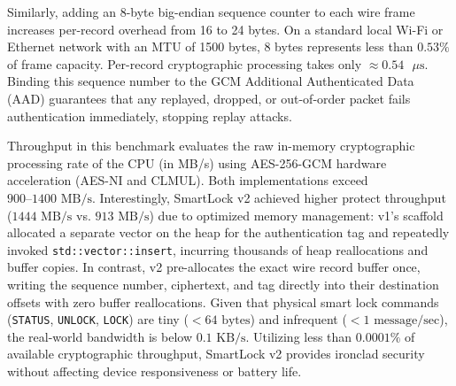 \documentclass[11pt,a4paper]{article}
\begin{document}
Similarly, adding an 8-byte big-endian sequence counter to each wire frame increases per-record overhead from 16 to 24 bytes. On a standard local Wi-Fi or Ethernet network with an MTU of 1500 bytes, 8 bytes represents less than $0.53\%$ of frame capacity. Per-record cryptographic processing takes only $\approx 0.54\text{ }\mu\text{s}$. Binding this sequence number to the GCM Additional Authenticated Data (AAD) guarantees that any replayed, dropped, or out-of-order packet fails authentication immediately, stopping replay attacks.

Throughput in this benchmark evaluates the raw in-memory cryptographic processing rate of the CPU (in MB/s) using AES-256-GCM hardware acceleration (AES-NI and CLMUL). Both implementations exceed $900\text{--}1400\text{ MB/s}$. Interestingly, SmartLock v2 achieved higher protect throughput ($1444\text{ MB/s}$ vs. $913\text{ MB/s}$) due to optimized memory management: v1's scaffold allocated a separate vector on the heap for the authentication tag and repeatedly invoked \texttt{std::vector::insert}, incurring thousands of heap reallocations and buffer copies. In contrast, v2 pre-allocates the exact wire record buffer once, writing the sequence number, ciphertext, and tag directly into their destination offsets with zero buffer reallocations. Given that physical smart lock commands (\texttt{STATUS}, \texttt{UNLOCK}, \texttt{LOCK}) are tiny ($<64\text{ bytes}$) and infrequent ($<1\text{ message/sec}$), the real-world bandwidth is below $0.1\text{ KB/s}$. Utilizing less than $0.0001\%$ of available cryptographic throughput, SmartLock v2 provides ironclad security without affecting device responsiveness or battery life.
\end{document}
